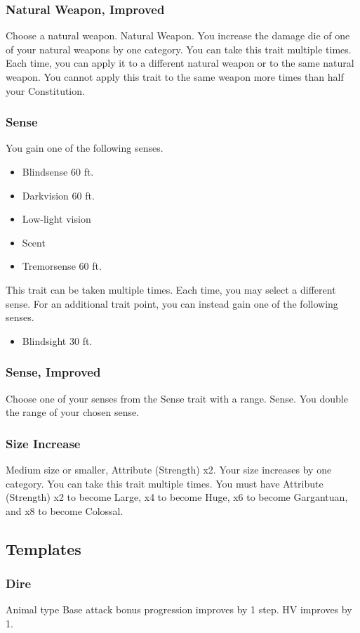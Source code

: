 \subsubsection{Natural Weapon, Improved}
Choose a natural weapon.
\featpre Natural Weapon.
\featben You increase the damage die of one of your natural weapons by one category.
 You can take this trait multiple times. Each time, you can apply it to a different natural weapon or to the same natural weapon. You cannot apply this trait to the same weapon more times than half your Constitution. 

\subsubsection{Sense}
\featben You gain one of the following senses.
\begin{itemize}
    \item Blindsense 60 ft.
    \item Darkvision 60 ft.
    \item Low-light vision
    \item Scent
    \item Tremorsense 60 ft.
\end{itemize}

 This trait can be taken multiple times. Each time, you may select a different sense.
 For an additional trait point, you can instead gain one of the following senses.
\begin{itemize}
    \item Blindsight 30 ft.
\end{itemize}

\subsubsection{Sense, Improved}
Choose one of your senses from the Sense trait with a range.
\featpre Sense.
\featben You double the range of your chosen sense.

\subsubsection{Size Increase}
\featpre Medium size or smaller, Attribute (Strength) x2.
\featben Your size increases by one category.
 You can take this trait multiple times. You must have Attribute (Strength) x2 to become Large, x4 to become Huge, x6 to become Gargantuan, and x8 to become Colossal.

\subsection{Templates}
\subsubsection{Dire}
\featpre Animal type
\featben Base attack bonus progression improves by 1 step. HV improves by 1.
